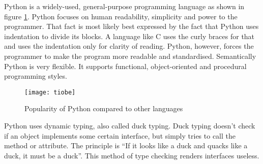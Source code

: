 Python is a widely-used, general-purpose programming language as shown in figure
\ref{python-popularity}. Python focuses on human readability, simplicity and
power to the
programmer.\cite{website:python-zen,website:python-faq-creation-reason} That
fact is most likely best expressed by the fact that Python uses indentation to
divide its blocks. A language like C uses the curly braces for that and uses the
indentation only for clarity of reading. Python, however, forces the programmer
to make the program more readable and standardised. Semantically Python is very
flexible. It supports functional, object-oriented and procedural programming
styles.

\begin{figure}[htp]
\begin{center}
  \texttt{[image: tiobe]}
  \caption[Python popularity]{Popularity of Python compared to other
  languages\cite{website:tiobe-index}}
  \label{python-popularity}
\end{center}
\end{figure}

Python uses dynamic typing, also called duck typing. Duck typing doesn't check
if an object implements some certain interface, but simply tries to call the
method or attribute. The principle is ``If it looks like a duck and quacks like
a duck, it must be a duck''.\cite[duck-typing]{website:python-glossary} This
method of type checking renders interfaces useless. 








